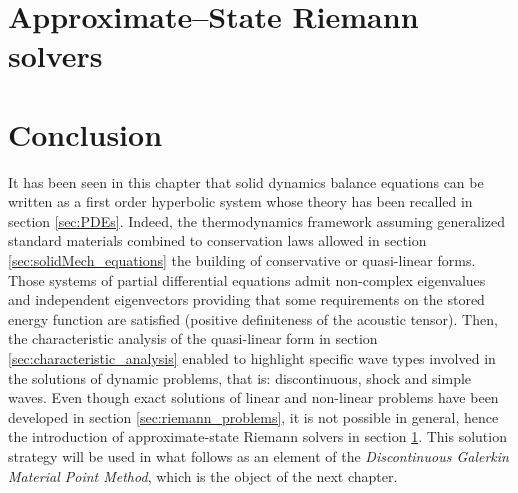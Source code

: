 \section{Approximate--State Riemann solvers}
\label{sec:riemann_solvers}


\section{Conclusion}
It has been seen in this chapter that solid dynamics balance equations can be written as a first order hyperbolic system whose theory has been recalled in section \ref{sec:PDEs}. Indeed, the thermodynamics framework assuming generalized standard materials combined to conservation laws allowed in section \ref{sec:solidMech_equations} the building of conservative or quasi-linear forms. Those systems of partial differential equations admit non-complex eigenvalues and independent eigenvectors providing that some requirements on the stored energy function are satisfied (positive definiteness of the acoustic tensor). Then, the characteristic analysis of the quasi-linear form in section \ref{sec:characteristic_analysis} enabled to highlight specific wave types involved in the solutions of dynamic problems, that is: discontinuous, shock and simple waves. Even though exact solutions of linear and non-linear problems have been developed in section \ref{sec:riemann_problems}, it is not possible in general, hence the introduction of approximate-state Riemann solvers in section \ref{sec:riemann_solvers}. This solution strategy will be used in what follows as an element of the \textit{Discontinuous Galerkin Material Point Method}, which is the object of the next chapter.

